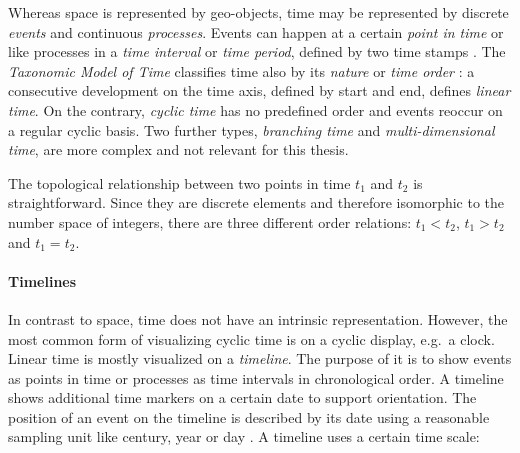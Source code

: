 Whereas space is represented by geo-objects, time may be represented by discrete \emph{events} and continuous \emph{processes}. Events can happen at a certain \emph{point in time} or like processes in a \emph{time interval} or \emph{time period}, defined by two time stamps
\cite[chapter 2, pp. 47-49]{solana2014spatio}.
The \emph{Taxonomic Model of Time} classifies time also by its \emph{nature} or \emph{time order}
\cite{frank98typesoftime}:
a consecutive development on the time axis, defined by start and end, defines \emph{linear time}. On the contrary, \emph{cyclic time} has no predefined order and events reoccur on a regular cyclic basis. Two further types, \emph{branching time} and \emph{multi-dimensional time}, are more complex and not relevant for this thesis.

The topological relationship between two points in time $t_1$ and $t_2$ is straightforward. Since they are discrete elements and therefore isomorphic to the number space of integers, there are three different order relations: $t_1 < t_2$, $t_1 > t_2$ and $t_1 = t_2$.


\paragraph{Timelines} %
\label{sub:timelines}

In contrast to space, time does not have an intrinsic representation. However, the most common form of visualizing cyclic time is on a cyclic display, e.g.\ a  clock. Linear time is mostly visualized on a \emph{timeline}. The purpose of it is to show events as points in time or processes as time intervals in chronological order. A timeline shows additional time markers on a certain date to support orientation. The position of an event on the timeline is described by its date using a reasonable sampling unit like century, year or day
\cite[p. 32]{Langran1989timeingis}.
A timeline uses a certain time scale:


